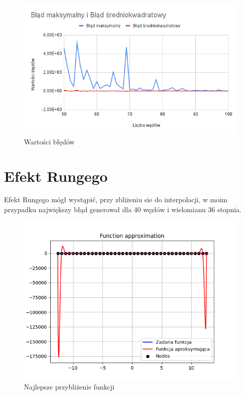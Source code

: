 \documentclass{article}
\begin{document}
\begin{figure}[H]
  \centering
  \begin{minipage}[b]{0.4\textwidth}
    \includegraphics[width=\textwidth]{img60.png}
    \caption{Wartości błędów}
  \end{minipage}
\end{figure}

\newpage

\section{Efekt Rungego}

Efekt Rungego mógł wystąpić, przy zbliżeniu sie do interpolacji, w moim przypadku największy błąd generował dla 40 węzłów i wielomianu 36 stopnia.

\begin{figure}[H]
  \centering
  \begin{minipage}[b]{0.4\textwidth}
    \includegraphics[width=\textwidth]{runge.png}
    \caption{Najlepsze przybliżenie funkcji}
  \end{minipage}
\end{figure}
\end{document}
